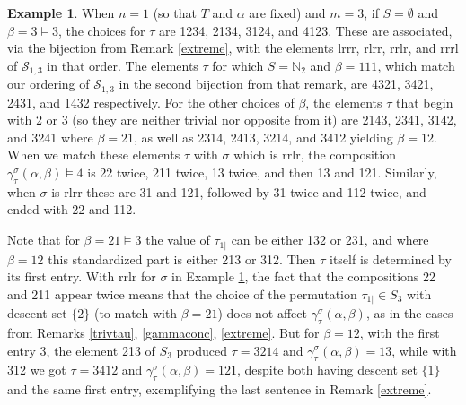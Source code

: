 \documentclass{article}
\theoremstyle{definition}
\newtheorem{ex}[thm]{Example}
\begin{document}
\begin{ex}
When $n=1$ (so that $T$ and $\alpha$ are fixed) and $m=3$, if $S=\emptyset$ and $\beta=3\vDash3$, the choices for $\tau$ are 1234, 2134, 3124, and 4123. These are associated, via the bijection from Remark \ref{extreme}, with the elements lrrr, rlrr, rrlr, and rrrl of $\mathcal{S}_{1,3}$ in that order. The elements $\tau$ for which $S=\mathbb{N}_{2}$ and $\beta=111$, which match our ordering of $\mathcal{S}_{1,3}$ in the second bijection from that remark, are 4321, 3421, 2431, and 1432 respectively. For the other choices of $\beta$, the elements $\tau$ that begin with 2 or 3 (so they are neither trivial nor opposite from it) are 2143, 2341, 3142, and 3241 where $\beta=21$, as well as 2314, 2413, 3214, and 3412 yielding $\beta=12$. When we match these elements $\tau$ with $\sigma$ which is rrlr, the composition $\gamma_{\tau}^{\sigma}(\alpha,\beta)\vDash4$ is 22 twice, 211 twice, 13 twice, and then 13 and 121. Similarly, when $\sigma$ is rlrr these are 31 and 121, followed by 31 twice and 112 twice, and ended with 22 and 112. \label{n1m3}
\end{ex}
Note that for $\beta=21\vDash3$ the value of $\tau_{1|}$ can be either 132 or 231, and where $\beta=12$ this standardized part is either 213 or 312. Then $\tau$ itself is determined by its first entry. With rrlr for $\sigma$ in Example \ref{n1m3}, the fact that the compositions 22 and 211 appear twice means that the choice of the permutation $\tau_{1|} \in S_{3}$ with descent set $\{2\}$ (to match with $\beta=21$) does not affect $\gamma_{\tau}^{\sigma}(\alpha,\beta)$, as in the cases from Remarks \ref{trivtau}, \ref{gammaconc}, \ref{extreme}. But for $\beta=12$, with the first entry 3, the element 213 of $S_{3}$ produced $\tau=3214$ and $\gamma_{\tau}^{\sigma}(\alpha,\beta)=13$, while with 312 we got $\tau=3412$ and $\gamma_{\tau}^{\sigma}(\alpha,\beta)=121$, despite both having descent set $\{1\}$ and the same first entry, exemplifying the last sentence in Remark \ref{extreme}.

\medskip
\end{document}
